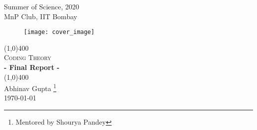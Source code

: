 \documentclass[../main.tex]{subfiles}
\begin{document}
\begin{titlepage}
\begin{center}

\vspace{1cm}
\Large{\textsf{ Summer of Science, 2020 }} \\
\vspace{1.5mm}
\large{\textsf{ MnP Club, IIT Bombay }}
\vfill
\begin{figure}[ht]
	\texttt{[image: cover\_image]}
\end{figure}

\vspace{10mm}
\line(1,0){400} \\[2mm]
\Huge{\textsc{ Coding Theory }}\\[3mm]
\Large{\textbf{- Final Report -}}\\[1mm]
\line(1,0){400} \\
\vfill
\textsf{Abhinav Gupta} \footnote{ Mentored by \textsf{Shourya Pandey} }\\
\textsf{\today} \\

\end{center}
\end{titlepage}
\end{document}

